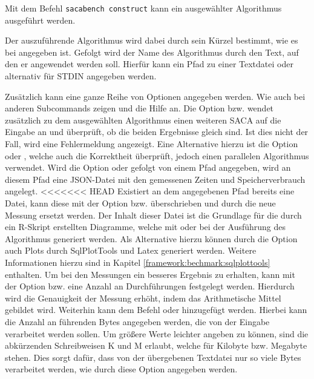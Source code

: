 {Mit dem Befehl \texttt{sacabench construct} kann ein ausgewählter Algorithmus ausgeführt werden. 
\par
Der auszuführende Algorithmus wird dabei durch sein Kürzel bestimmt, wie es bei  angegeben ist. 
Gefolgt wird der Name des Algorithmus durch den Text, auf den er angewendet werden soll. 
Hierfür kann ein Pfad zu einer Textdatei oder alternativ \termfont{-} für STDIN angegeben werden. 
\par
Zusätzlich kann eine ganze Reihe von Optionen angegeben werden. 
Wie auch bei anderen Subcommands zeigen  und  die Hilfe an. 
Die Option  bzw.  wendet zusätzlich zu dem ausgewählten Algorithmus einen weiteren SACA auf die Eingabe an und überprüft, ob die beiden Ergebnisse gleich sind. 
Ist dies nicht der Fall, wird eine Fehlermeldung angezeigt. 
Eine Alternative hierzu ist die Option  oder , welche auch die Korrektheit überprüft, jedoch einen parallelen Algorithmus verwendet. 
Wird die Option  oder  gefolgt von einem Pfad angegeben, wird an diesem Pfad eine JSON-Datei mit den gemessenen Zeiten und Speicherverbrauch angelegt. 
<<<<<<< HEAD
Existiert an dem angegebenen Pfad bereits eine Datei, kann diese mit der Option  bzw.  überschrieben und durch die neue Messung ersetzt werden. 
Der Inhalt dieser Datei ist die Grundlage für die durch ein R-Skript erstellten Diagramme, welche mit  oder  bei der Ausführung des Algorithmus generiert werden. 
Als Alternative hierzu können durch die Option  auch Plots durch SqlPlotTools und Latex generiert werden.
Weitere Informationen hierzu sind in Kapitel \ref{framework:bechmark:sqlplottools} enthalten.
Um bei den Messungen ein besseres Ergebnis zu erhalten, kann mit der Option  bzw.  eine Anzahl an Durchführungen festgelegt werden. 
Hierdurch wird die Genauigkeit der Messung erhöht, indem das Arithmetische Mittel gebildet wird.
Weiterhin kann dem Befehl  oder  hinzugefügt werden. 
Hierbei kann die Anzahl an führenden Bytes angegeben werden, die von der Eingabe verarbeitet werden sollen.
Um größere Werte leichter angeben zu können, sind die abkürzenden Schreibweisen K und M erlaubt, welche für Kilobyte bzw. Megabyte stehen.
Dies sorgt dafür, dass von der übergebenen Textdatei nur so viele Bytes verarbeitet werden, wie durch diese Option angegeben werden. 
}
